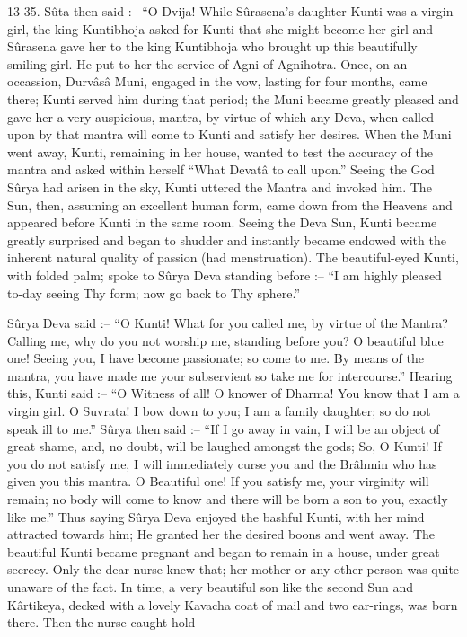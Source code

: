 13-35. S\^uta then said :-- ``O Dvija! While S\^urasena's daughter Kunti was a virgin girl, the king Kuntibhoja asked for Kunti that she might become her girl and S\^urasena gave her to the king Kuntibhoja who brought up this beautifully smiling girl. He put to her the service of Agni of Agnihotra. Once, on an occassion, Durv\^as\^a Muni, engaged in the vow, lasting for four months, came there; Kunti served him during that period; the Muni became greatly pleased and gave her a very auspicious, mantra, by virtue of which any Deva, when called upon by that mantra will come to Kunti and satisfy her desires. When the Muni went away, Kunti, remaining in her house, wanted to test the accuracy of the mantra and asked within herself  ``What Devat\^a to call upon.'' Seeing the God S\^urya had arisen in the sky, Kunti uttered the Mantra and invoked him. The Sun, then, assuming an excellent human form, came down from the Heavens and appeared before Kunti in the same room. Seeing the Deva Sun, Kunti became greatly surprised and began to shudder and instantly became endowed with the inherent natural quality of passion (had menstruation). The beautiful-eyed Kunti, with folded palm; spoke to S\^urya Deva standing before :-- ``I am highly pleased to-day seeing Thy form; now go back to Thy sphere.''

S\^urya Deva said :-- ``O Kunti! What for you called me, by virtue of the Mantra? Calling me, why do you not worship me, standing before you? O beautiful blue one! Seeing you, I have become passionate; so come to me. By means of the mantra, you have made me your subservient so take me for intercourse.'' Hearing this, Kunti said :-- ``O Witness of all! O knower of Dharma! You know that I am a virgin girl. O Suvrata! I bow down to you; I am a family daughter; so do not speak ill to me.'' S\^urya then said :-- ``If I go away in vain, I will be an object of great shame, and, no doubt, will be laughed amongst the gods; So, O Kunti! If you do not satisfy me, I will immediately curse you and the Br\^ahmin who has given you this mantra. O Beautiful one! If you satisfy me, your virginity will remain; no body will come to know and there will be born a son to you, exactly like me.'' Thus saying S\^urya Deva enjoyed the bashful Kunti, with her mind attracted towards him; He granted her the desired boons and went away. The beautiful Kunti became pregnant and began to remain in a house, under great secrecy. Only the dear nurse knew that; her mother or any other person was quite unaware of the fact. In time, a very beautiful son like the second Sun and K\^artikeya, decked with a lovely Kavacha coat of mail and two ear-rings, was born there. Then the nurse caught hold


